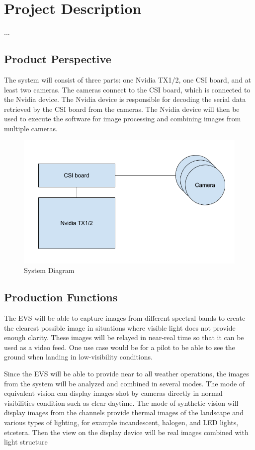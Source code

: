 \documentclass[]{report}
\begin{document}
\section{Project Description}
...
\subsection{Product Perspective}
The system will consist of three parts: one Nvidia TX1/2, one CSI board, and at least two cameras. The cameras connect to the CSI board, which is connected to the Nvidia device. The Nvidia device is responsible for decoding the serial data retrieved by the CSI board from the cameras. The Nvidia device will then be used to execute the software for image processing and combining images from multiple cameras.

\begin{figure}[h]
    \centering
    \includegraphics[width=1\textwidth]{diagram}
    \caption{System Diagram}
    \label{fig:mesh1}
\end{figure}

\subsection{Production Functions}
The EVS will be able to capture images from different spectral bands to create the clearest possible image in situations where visible light does not provide enough clarity. These images will be relayed in near-real time so that it can be used as a video feed. One use case would be for a pilot to be able to see the ground when landing in low-visibility conditions.

Since the EVS will be able to provide near to all weather operations, the images from the system will be analyzed and combined in several modes. The mode of equivalent vision can display images shot by cameras directly in normal visibilities condition such as clear daytime. The mode of synthetic vision will display images from the channels provide thermal images of the landscape and various types of lighting, for example incandescent, halogen, and LED lights, etcetera. Then the view on the display device will be real images combined with light structure
\end{document}
